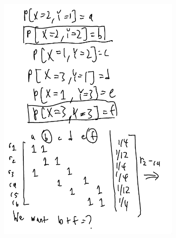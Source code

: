 \documentclass[a4paper]{article}
\begin{document}
\begin{enumerate}
\begin{enumerate}
\begin{note}
\begin{figure}[H]
  \centering
  \includegraphics[width=0.8\textwidth]{assets/2024-09-13-16-16-34.png}
  \caption{}
  \label{fig:2024-09-13-16-16-34}
\end{figure}


\end{note}
\end{enumerate}
\end{enumerate}
\end{document}
